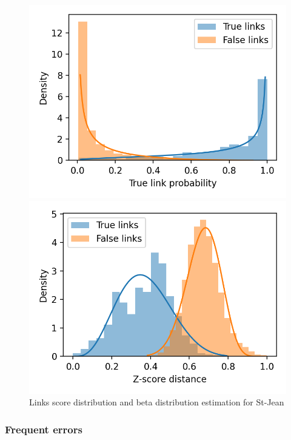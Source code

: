 \begin{figure}
  \caption{Links score distribution and beta distribution estimation for St-Jean}
  \label{fig:links_score_density}

  \label{fig:links_score_density_fusion_regression}
  \includegraphics[width=\linewidth]{img/links_score_density_fusion_regression.png}

  \label{fig:links_score_density_fusion_z_score}
  \includegraphics[width=\linewidth]{img/links_score_density_fusion_z_score.png}
\end{figure}

\subsubsection{Frequent errors}
\label{sec:frequent_errors}

